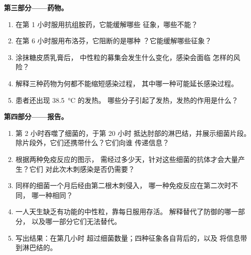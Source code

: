 \begin{problem}
\medskip
\noindent\textbf{第三部分——药物。}
\begin{enumerate}[resume]
  \item 在第 1 小时服用抗组胺药，它能缓解哪些
        征象，哪些不能？
  \item 在第 6 小时服用布洛芬，它阻断的是哪种
        ？它能缓解哪些征象？
  \item 涂抹糖皮质乳膏后，
        中性粒的募集会发生什么变化，感染会面临
        怎样的风险？
  \item 解释三种药物为何都不能缩短感染过程，
        其中哪一种可能延长感染过程。
  \item 患者还出现 \qty{38.5}{\celsius} 的发热。
        哪些分子引起了发热，发热的作用是什么？
\end{enumerate}

\medskip
\noindent\textbf{第四部分——报告。}
\begin{enumerate}[resume]
  \item 第 2 小时吞噬了细菌的，于第 20 小时
        抵达肘部的淋巴结，并展示细菌片段。
        除片段外，它们还携带什么？它们向谁
        传递信息？
  \item 根据两种免疫反应的图示，
        需经过多少天，针对这些细菌的抗体才会大量产生？它们
        对此次木刺感染是否仍需要？
  \item 同样的细菌一个月后经由第二根木刺侵入，
        哪一种免疫反应在第二次时不同，
        哪一种相同？
  \item 一人天生缺乏有功能的中性粒，靠每日服用存活。
        解释替代了防御的哪一部分，
        以及哪一部分它们无法替代。
  \item 写出结果：在第几小时
        超过细菌数量；四种征象各自背后的，以及
        将信息带到淋巴结的。
\end{enumerate}
\end{problem}
